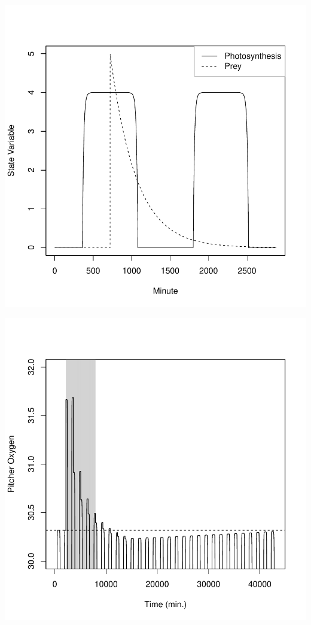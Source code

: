 \documentclass[a0,landscape]{a0poster}
\begin{document}
\begin{multicols}{4}
\begin{block}{}

\includegraphics{conference_poster_5-base}

\end{block}


\begin{block}{}
\includegraphics{conference_poster_5-hyst}


\end{block}
\end{multicols}
\end{document}
